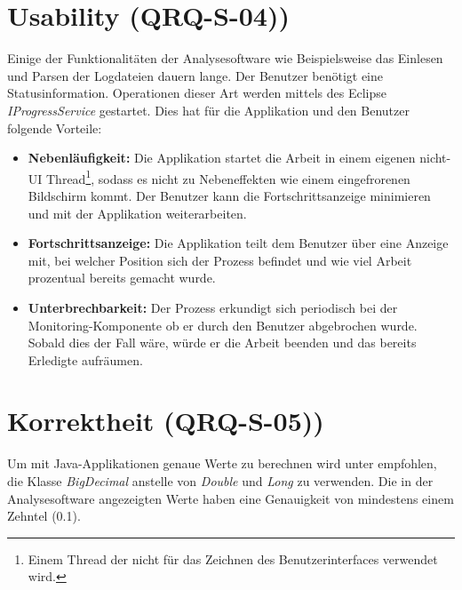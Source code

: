 \section{Usability (QRQ-S-04))}
Einige der Funktionalitäten der Analysesoftware wie Beispielsweise das Einlesen und Parsen der Logdateien dauern lange. Der Benutzer benötigt eine Statusinformation. Operationen dieser Art werden mittels des Eclipse \textit{IProgressService} gestartet. Dies hat für die Applikation und den Benutzer folgende Vorteile:
\begin{itemize}
	\item \textbf{Nebenläufigkeit:} Die Applikation startet die Arbeit in einem eigenen nicht-UI Thread\footnote{Einem Thread der nicht für das Zeichnen des Benutzerinterfaces verwendet wird.}, sodass es nicht zu Nebeneffekten wie einem eingefrorenen Bildschirm kommt. Der Benutzer kann die Fortschrittsanzeige minimieren und mit der Applikation weiterarbeiten.
	\item \textbf{Fortschrittsanzeige: } Die Applikation teilt dem Benutzer über eine Anzeige mit, bei welcher Position sich der Prozess befindet und wie viel Arbeit prozentual bereits gemacht wurde.
	\item \textbf{Unterbrechbarkeit: } Der Prozess erkundigt sich periodisch bei der Monitoring-Komponente ob er durch den Benutzer abgebrochen wurde. Sobald dies der Fall wäre, würde er die Arbeit beenden und das bereits Erledigte aufräumen.
\end{itemize}


\section{Korrektheit (QRQ-S-05))}
Um mit Java-Applikationen genaue Werte zu berechnen wird unter \cite{bloch2008effective} empfohlen, die Klasse \textit{BigDecimal} anstelle von \textit{Double} und \textit{Long} zu verwenden. Die in der Analysesoftware angezeigten Werte haben eine Genauigkeit von mindestens einem Zehntel (0.1).
